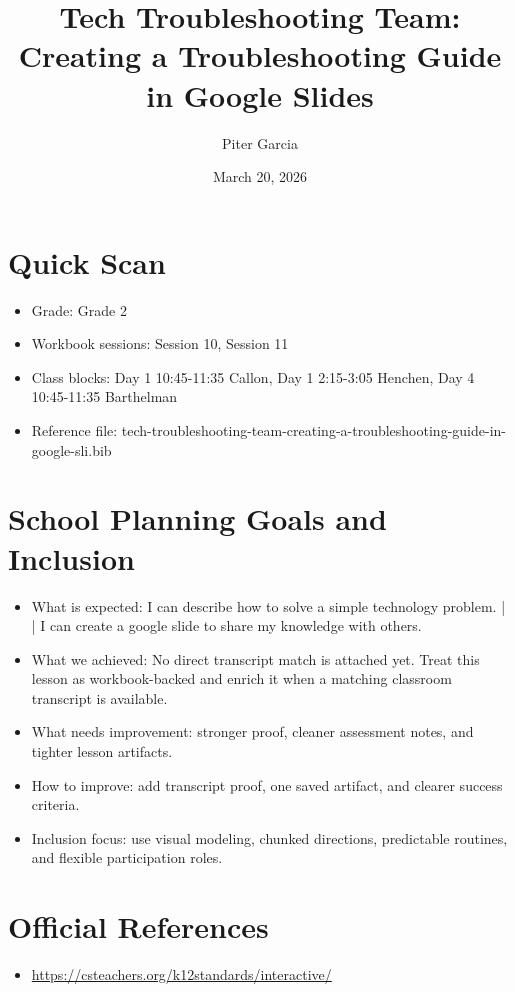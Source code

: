 \documentclass[11pt]{article}
\title{Tech Troubleshooting Team: Creating a Troubleshooting Guide in Google Slides}
\author{Piter Garcia}
\date{March 20, 2026}
\begin{document}
\maketitle
\section*{Quick Scan}
\begin{itemize}[leftmargin=*]
\item Grade: Grade 2
\item Workbook sessions: Session 10, Session 11
\item Class blocks: Day 1 10:45-11:35 Callon, Day 1 2:15-3:05 Henchen, Day 4 10:45-11:35 Barthelman
\item Reference file: tech-troubleshooting-team-creating-a-troubleshooting-guide-in-google-sli.bib
\end{itemize}
\section*{School Planning Goals and Inclusion}
\begin{itemize}[leftmargin=*]
\item What is expected: I can describe how to solve a simple technology problem. | | I can create a google slide to share my knowledge with others.
\item What we achieved: No direct transcript match is attached yet. Treat this lesson as workbook-backed and enrich it when a matching classroom transcript is available.
\item What needs improvement: stronger proof, cleaner assessment notes, and tighter lesson artifacts.
\item How to improve: add transcript proof, one saved artifact, and clearer success criteria.
\item Inclusion focus: use visual modeling, chunked directions, predictable routines, and flexible participation roles.
\end{itemize}
\section*{Official References}
\begin{itemize}[leftmargin=*]
\item \url{https://csteachers.org/k12standards/interactive/}

\end{itemize}
\end{document}
